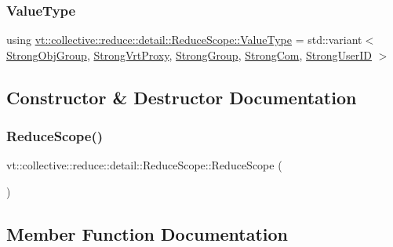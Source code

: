 \subsubsection{\texorpdfstring{Value\+Type}{ValueType}}
{\footnotesize\ttfamily using \hyperlink{structvt_1_1collective_1_1reduce_1_1detail_1_1_reduce_scope_aac14cd07e9678d96b761d90aa1ed3bb0}{vt\+::collective\+::reduce\+::detail\+::\+Reduce\+Scope\+::\+Value\+Type} =  std\+::variant$<$ \hyperlink{namespacevt_1_1collective_1_1reduce_1_1detail_afd4940b3a4ac2ef740f0e3844a09dd08}{Strong\+Obj\+Group}, \hyperlink{namespacevt_1_1collective_1_1reduce_1_1detail_a492943cffff6d1a92386468d46f589df}{Strong\+Vrt\+Proxy}, \hyperlink{namespacevt_1_1collective_1_1reduce_1_1detail_adcad97800459415ff6ea4b5feb90e0f2}{Strong\+Group}, \hyperlink{namespacevt_1_1collective_1_1reduce_1_1detail_a6ea2d8e8f8ba226a6e704a9041aebaec}{Strong\+Com}, \hyperlink{namespacevt_1_1collective_1_1reduce_1_1detail_af9e42b20d1be7dccc1b5e587f0387e02}{Strong\+User\+ID} $>$}



\subsection{Constructor \& Destructor Documentation}
\mbox{\label{structvt_1_1collective_1_1reduce_1_1detail_1_1_reduce_scope_ac1da975b48590fd29147a12ef1be3e56}} 
\subsubsection{\texorpdfstring{Reduce\+Scope()}{ReduceScope()}}
{\footnotesize\ttfamily vt\+::collective\+::reduce\+::detail\+::\+Reduce\+Scope\+::\+Reduce\+Scope (\begin{DoxyParamCaption}{ }\end{DoxyParamCaption})\hspace{0.3cm}{\ttfamily [default]}}



\subsection{Member Function Documentation}
\mbox{\label{structvt_1_1collective_1_1reduce_1_1detail_1_1_reduce_scope_aaceb69a568f8a644c99b4cdd0769abab}} 
